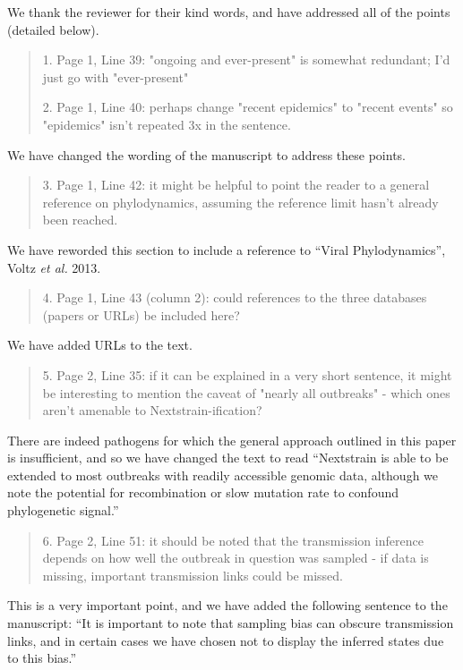 \documentclass[12pt,a4paper]{article}
\begin{document}
We thank the reviewer for their kind words, and have addressed all of the points (detailed below).

\begin{quote}
1. Page 1, Line 39: "ongoing and ever-present" is somewhat redundant; I'd just go with "ever-present"

2. Page 1, Line 40: perhaps change "recent epidemics" to "recent events" so "epidemics" isn't repeated 3x in the sentence.
\end{quote}

We have changed the wording of the manuscript to address these points. 

\begin{quote}
3. Page 1, Line 42: it might be helpful to point the reader to a general reference on phylodynamics, assuming the reference limit hasn't already been reached.
\end{quote}
We have reworded this section to include a reference to ``Viral Phylodynamics'', Voltz \textit{et al.} 2013.

\begin{quote}
4. Page 1, Line 43 (column 2): could references to the three databases (papers or URLs) be included here?
\end{quote}
We have added URLs to the text.

\begin{quote}
5. Page 2, Line 35: if it can be explained in a very short sentence, it might be interesting to mention the caveat of "nearly all outbreaks" - which ones aren't amenable to Nextstrain-ification?
\end{quote}
There are indeed pathogens for which the general approach outlined in this paper is insufficient, and so we have changed the text to read ``Nextstrain is able to be extended to most outbreaks with readily accessible genomic data, although we note the potential for recombination or slow mutation rate to confound phylogenetic signal.''


\begin{quote}
6. Page 2, Line 51: it should be noted that the transmission inference depends on how well the outbreak in question was sampled - if data is missing, important transmission links could be missed.
\end{quote}
This is a very important point, and we have added the following sentence to the manuscript: ``It is important to note that sampling bias can obscure transmission links, and in certain cases we have chosen not to display the inferred states due to this bias.''
\end{document}
